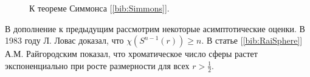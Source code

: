 \begin{figure}[h]
\centering
\captionsetup{justification=centering}
\begin{minipage}[h]{0.5\linewidth}
\end{minipage}\hfill
\begin{minipage}[h]{0.5\linewidth}
\end{minipage}\hfill
\caption{К теореме Симмонса [\ref{bib:Simmons}].}
\label{chapter1:fig:simmons}
\end{figure}

В дополнение к предыдущим рассмотрим некоторые асимптотические оценки. 
В 1983 году  Л. Ловас доказал, что  $\chi(S^{n-1}(r)) \geq n$. В статье [\ref{bib:RaiSphere}] А.М. Райгородским показал, что хроматическое число сферы растет экспоненциально при росте размерности для всех $r > \frac{1}{2}$.

